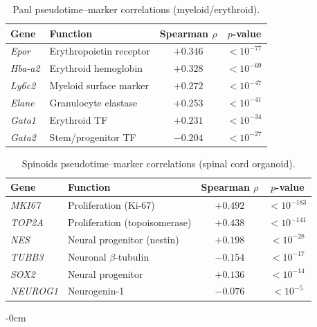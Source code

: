 \documentclass[biology,article,submit,pdftex]{Definitions/mdpi}
\begin{document}
\begin{table}[!t]
    \centering
    \caption{Paul pseudotime--marker correlations (myeloid/erythroid).}
    \label{tab:paul_markers}
    \begin{tabular}{llcc}
        \toprule
        Gene & Function & Spearman $\rho$ & $p$-value \\
        \midrule
        \textit{Epor}   & Erythropoietin receptor  & $+0.346$ & $< 10^{-77}$ \\
        \textit{Hba-a2} & Erythroid hemoglobin     & $+0.328$ & $< 10^{-69}$ \\
        \textit{Ly6c2}  & Myeloid surface marker   & $+0.272$ & $< 10^{-47}$ \\
        \textit{Elane}  & Granulocyte elastase     & $+0.253$ & $< 10^{-41}$ \\
        \textit{Gata1}  & Erythroid TF             & $+0.231$ & $< 10^{-34}$ \\
        \textit{Gata2}  & Stem/progenitor TF       & $-0.204$ & $< 10^{-27}$ \\
        \bottomrule
    \end{tabular}
\end{table}

\begin{table}[!t]
    \centering
    \caption{Spinoids pseudotime--marker correlations (spinal cord organoid).}
    \label{tab:spinoids_markers}
    \begin{tabular}{llcc}
        \toprule
        Gene & Function & Spearman $\rho$ & $p$-value \\
        \midrule
        \textit{MKI67}   & Proliferation (Ki-67)         & $+0.492$ & $< 10^{-183}$ \\
        \textit{TOP2A}   & Proliferation (topoisomerase)  & $+0.438$ & $< 10^{-141}$ \\
        \textit{NES}     & Neural progenitor (nestin)     & $+0.198$ & $< 10^{-28}$  \\
        \textit{TUBB3}   & Neuronal $\beta$-tubulin       & $-0.154$ & $< 10^{-17}$  \\
        \textit{SOX2}    & Neural progenitor              & $+0.136$ & $< 10^{-14}$  \\
        \textit{NEUROG1} & Neurogenin-1                   & $-0.076$ & $< 10^{-5}$   \\
        \bottomrule
    \end{tabular}
\end{table}

\begin{adjustwidth}{-\extralength}{0cm}

\end{adjustwidth}
\PublishersNote{}
\end{document}
